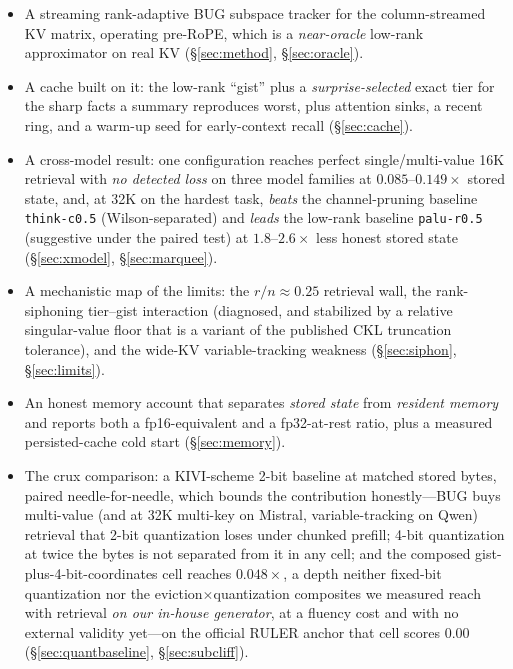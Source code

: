 \documentclass[11pt]{article}
\begin{document}
\begin{itemize}[leftmargin=1.4em]
\item A streaming rank-adaptive BUG subspace tracker for the column-streamed KV
matrix, operating pre-RoPE, which is a \emph{near-oracle} low-rank approximator
on real KV (\S\ref{sec:method}, \S\ref{sec:oracle}).
\item A cache built on it: the low-rank ``gist'' plus a \emph{surprise-selected}
exact tier for the sharp facts a summary reproduces worst, plus attention sinks,
a recent ring, and a warm-up seed for early-context recall (\S\ref{sec:cache}).
\item A cross-model result: one configuration reaches perfect single/multi-value
16K retrieval with \emph{no detected loss} on three model families at
$0.085$--$0.149\times$ stored state, and, at 32K on the hardest task, \emph{beats}
the channel-pruning baseline \texttt{think-c0.5} (Wilson-separated) and
\emph{leads} the low-rank baseline \texttt{palu-r0.5} (suggestive under the paired
test) at $1.8$--$2.6\times$ less honest stored state (\S\ref{sec:xmodel}, \S\ref{sec:marquee}).
\item A mechanistic map of the limits: the $r/n\approx0.25$ retrieval wall, the
rank-siphoning tier--gist interaction (diagnosed, and stabilized by a relative
singular-value floor that is a variant of the published CKL truncation
tolerance), and the wide-KV variable-tracking weakness (\S\ref{sec:siphon},
\S\ref{sec:limits}).
\item An honest memory account that separates \emph{stored state} from
\emph{resident memory} and reports both a fp16-equivalent and a fp32-at-rest
ratio, plus a measured persisted-cache cold start (\S\ref{sec:memory}).
\item The crux comparison: a KIVI-scheme 2-bit baseline at matched stored
bytes, paired needle-for-needle, which bounds the contribution honestly---BUG
buys multi-value (and at 32K multi-key on Mistral, variable-tracking on Qwen)
retrieval that 2-bit quantization loses under chunked prefill; 4-bit quantization at twice the bytes is
not separated from it in any cell; and the composed
gist-plus-4-bit-coordinates cell reaches $0.048\times$, a depth neither fixed-bit
quantization nor the eviction$\times$quantization composites we measured reach with
retrieval \emph{on our in-house generator}, at a fluency cost and with no external
validity yet---on the official RULER anchor that cell scores $0.00$
(\S\ref{sec:quantbaseline}, \S\ref{sec:subcliff}).
\end{itemize}
\end{document}
